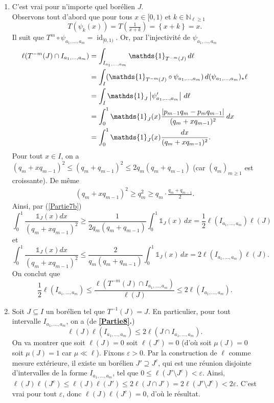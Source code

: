 \documentclass[french]{article}
\theoremstyle{definition}
\newcommand{\set}[1]{\left\{#1\right\}}
\newcommand{\tuple}[1]{\left(#1\right)}
\newcommand{\abs}[1]{\left|#1\right|}
\newcommand{\indi}{\mathds{1}}
\newcommand{\Nbb}{\mathbb{N}}
\newcommand{\id}{\operatorname{id}}
\begin{document}
\begin{enumerate}
    \item \label{Partie8}
        C'est vrai pour n'importe quel bor\'elien $J$.\\
        Observons tout d'abord que pour tous $x \in [0,1)$ et $k \in \Nbb_{\ell \ge 1}$
            $$T(\psi_k(x)) = T\tuple{\tfrac{1}{x + k}} = \set{x + k} = x.$$
        Il suit que $T^m \circ \psi_{a_1,\ldots,a_m} = \id_{[0,1)}$. Or, par l'injectivit\'e de $\psi_{a_1,\ldots,a_m}$
            \begin{align*}
                \allowdisplaybreaks
                \ell(T^{-m}(J) \cap I_{a_1,\ldots,a_m}) & = \int_{I_{a_1,\ldots,a_m}} \indi_{T^{-m}(J)}\,d\ell \\
                & = \int_I (\indi_{T^{-m}(J)} \circ \psi_{a_1,\ldots,a_m}) \,d(\psi_{a_1,\ldots,a_m})_\ast \ell \\
                & = \int_I \indi_{J} \abs{\psi'_{a_1,\ldots,a_m}} \,d\ell \\
                & = \int_0^1 \indi_{J}(x) \frac{|p_{m-1}q_m - p_mq_{m-1}|}{(q_m + xq_{m-1})^2}\,dx\\
                & = \int_0^1 \indi_{J}(x) \frac{dx}{(q_m + xq_{m-1})^2}.
            \end{align*}
        Pour tout $x \in I$, on a $(q_m + xq_{m-1})^2 \le (q_m + q_{m-1})^2 \le 2q_m(q_m + q_{m-1})$ (car $(q_m)_{m \ge 1}$ est croissante).
        De m\^eme
            \begin{align*}
                (q_m + xq_{m-1})^2 \ge q_m^2 \ge q_m \cdot \frac{q_m + q_{m-1}}{2}.
            \end{align*}
        Ainsi, par (\ref{Partie7b})
            $$\int_0^1  \frac{\indi_{J}(x) dx}{(q_m + xq_{m-1})^2} \ge \frac{1}{2q_m(q_m + q_{m-1})} \int_0^1 \indi_{J}(x)\,dx = \frac{1}{2}\ell(I_{a_1,\ldots,a_m})\ell(J)$$
        et
            $$\int_0^1  \frac{\indi_{J}(x)dx}{(q_m + xq_{m-1})^2} \le \frac{2}{q_m(q_m + q_{m-1})} \int_0^1 \indi_{J}(x)\,dx = 2\ell(I_{a_1,\ldots,a_m})\ell(J).$$
        On conclut que  
            $$\frac{1}{2}\ell(I_{a_1,\ldots,a_m}) \le \frac{\ell(T^{-m}(J) \cap I_{a_1,\ldots,a_m})}{\ell(J)} \le 2\ell(I_{a_1,\ldots,a_m}).$$

    \item \label{Partie9} Soit $J \subseteq I$ un bor\'elien tel que $T^{-1}(J) = J$. En particulier, pour tout intervalle $I_{a_1,\ldots,a_m}$, on a (de {\bf \ref{Partie8}.})
        $$\ell(J) \ell( I_{a_1,\ldots,a_m}) \le 2\ell(J \cap I_{a_1,\ldots,a_m}).$$
    On va montrer que soit $\ell(J) = 0$ soit $\ell(J^c) = 0$ (d'o\`u soit $\mu(J) = 0$ soit $\mu(J) = 1$ car $\mu \ll \ell$). Fixons $\varepsilon > 0$. Par la construction de $\ell$ comme mesure ext\'erieure, il existe un bor\'elien $J' \supseteq J^c$, qui est une r\'eunion disjointe d'intervalles de la forme $I_{a_1,\ldots,a_m}$, tel que $0 \le \ell(J' \setminus J^c) < \varepsilon$. Ainsi, $\ell(J)\ell(J^c) \le \ell(J)\ell(J') \le 2\ell(J \cap J') = 2\ell(J' \setminus J^c) < 2\varepsilon$. C'est vrai pour tout $\varepsilon$, donc $\ell(J)\ell(J^c) = 0$, d'o\`u le r\'esultat.
\end{enumerate}
\end{document}
